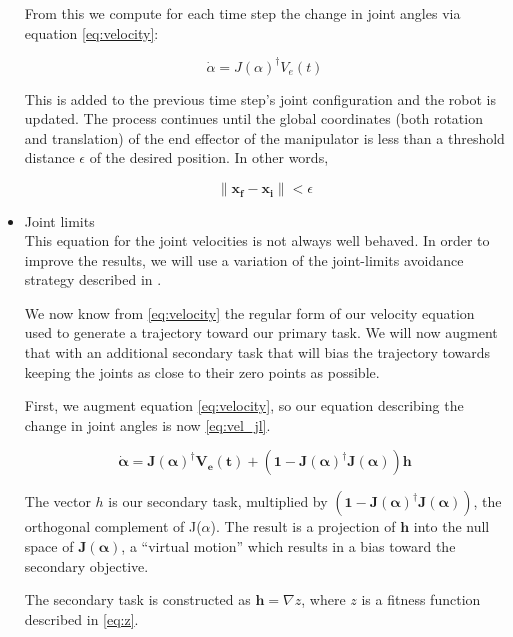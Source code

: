 \documentclass[10pt, conference]{IEEEtran}
\begin{document}
\begin{itemize}
     From this we compute for each time step the change in joint angles
     via equation \ref{eq:velocity}:

     \begin{equation}
     \label{eq:velocity}
     \dot{\alpha} = J(\alpha)^{\dagger}V_e(t)
     \end{equation}

     This is added to the previous time step's joint configuration and
     the robot is updated. The process continues until the global
     coordinates (both rotation and translation) of the end effector
     of the manipulator is less than a threshold distance $\epsilon$
     of the desired position. In other words,

     \begin{equation}
     \label{eq:distance}
     \| \mathbf{x_f - x_i} \| < \epsilon
     \end{equation}


\item Joint limits\\
\label{sec-3-4-1-3}%
This equation for the joint velocities is not always well
     behaved. In order to improve the results, we will use a variation
     of the joint-limits avoidance strategy described in
     \cite{luc_baron}.

     We now know from \ref{eq:velocity} the regular form of our
     velocity equation used to generate a trajectory toward our primary
     task. We will now augment that with an additional secondary task
     that will bias the trajectory towards keeping the joints as close
     to their zero points as possible.

     First, we augment equation \ref{eq:velocity}, so our equation
     describing the change in joint angles is now \ref{eq:vel_jl}.

     \begin{equation}
     \label{eq:vel_jl}
     \mathbf{\dot{\alpha} = J(\alpha)^{\dagger}V_e(t) + (1 -
     J(\alpha)^{\dagger}J(\alpha))h}
     \end{equation}

     The vector \(h\) is our secondary task, multiplied by \(\mathbf{
     (1 - J(\alpha)^{\dagger}J(\alpha))}\), the orthogonal complement
     of J($\alpha$). The result is a projection of \(\mathbf{h}\) into
     the null space of \(\mathbf{J(\alpha)}\), a ``virtual motion'' which
     results in a bias toward the secondary objective.

     The secondary task is constructed as  \(\mathbf{h} = \nabla z\),
     where \(z\) is a fitness function described in \ref{eq:z}.


\end{itemize}
\end{document}
